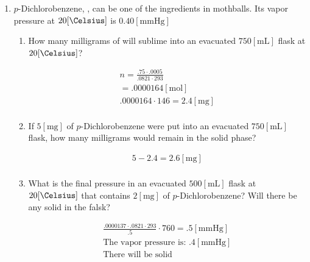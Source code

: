 \documentclass[12pt]{article}
\begin{document}
\begin{enumerate}
\begin{enumerate}
    \end{enumerate}

    \setcounter{enumi}{5}

  \item $p$-Dichlorobenzene, , can be one of the ingredients in mothballs. Its vapor pressure at $20[\si{\Celsius}]$ is $0.40[\si{\mmHg}]$

    \begin{enumerate}

      \item How many milligrams of  will sublime into an evacuated $750[\si{\milli\liter}]$ flask at $20[\si{\Celsius}]$?
        
        \begin{equation}
          \begin{split}
            n=\frac{.75\cdot.0005}{.0821\cdot293}\\
            =.0000164[\si{\mole}]\\
            .0000164\cdot146=2.4[\si{\milli\gram}]\\
          \end{split}
          \label{4}
        \end{equation}

      \item If $5[\si{\milli\gram}]$ of $p$-Dichlorobenzene were put into an evacuated $750[\si{\milli\liter}]$ flask, how many milligrams would remain in the solid phase?

        \begin{equation}
          \begin{split}
            5-2.4=2.6[\si{\milli\gram}]\\
          \end{split}
          \label{5}
        \end{equation}

      \item What is the final pressure in an evacuated $500[\si{\milli\liter}]$ flask at $20[\si{\Celsius}]$ that contains $2[\si{\milli\gram}]$ of $p$-Dichlorobenzene? Will there be any solid in the falsk?

        \begin{equation}
          \begin{split}
            \frac{.0000137\cdot.0821\cdot293}{.5}\cdot760=.5[\si{\mmHg}]\\
            \text{The vapor pressure is: }.4[\si{\mmHg}]\\
              \text{There will be solid}
          \end{split}
          \label{6}
        \end{equation}


\end{enumerate}
\end{enumerate}
\end{document}
